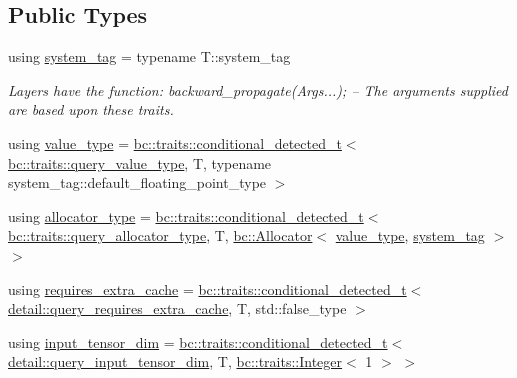 \subsection*{Public Types}
\begin{DoxyCompactItemize}
\item 
using \hyperlink{structbc_1_1nn_1_1layer__traits_a95a88b919abd7c9ebe295a3f5171b31e}{system\+\_\+tag} = typename T\+::system\+\_\+tag
\begin{DoxyCompactList}\small\item\em Layers have the function\+: backward\+\_\+propagate(Args...); -- The arguments supplied are based upon these traits. \end{DoxyCompactList}\item 
using \hyperlink{structbc_1_1nn_1_1layer__traits_a998c8708310306546aa5edb3ad1b46b8}{value\+\_\+type} = \hyperlink{namespacebc_1_1traits_a1a6d378947ec32acd457890854bcd592}{bc\+::traits\+::conditional\+\_\+detected\+\_\+t}$<$ \hyperlink{namespacebc_1_1traits_a40b9437a2ec1bb34ee7d506c8053f906}{bc\+::traits\+::query\+\_\+value\+\_\+type}, T, typename system\+\_\+tag\+::default\+\_\+floating\+\_\+point\+\_\+type $>$
\item 
using \hyperlink{structbc_1_1nn_1_1layer__traits_afbe9ab9133f903efde7f3d307836d489}{allocator\+\_\+type} = \hyperlink{namespacebc_1_1traits_a1a6d378947ec32acd457890854bcd592}{bc\+::traits\+::conditional\+\_\+detected\+\_\+t}$<$ \hyperlink{namespacebc_1_1traits_ab141f0cc8348b4b7ebcb48e6bbb50d09}{bc\+::traits\+::query\+\_\+allocator\+\_\+type}, T, \hyperlink{classbc_1_1allocators_1_1Allocator}{bc\+::\+Allocator}$<$ \hyperlink{structbc_1_1nn_1_1layer__traits_a998c8708310306546aa5edb3ad1b46b8}{value\+\_\+type}, \hyperlink{structbc_1_1nn_1_1layer__traits_a95a88b919abd7c9ebe295a3f5171b31e}{system\+\_\+tag} $>$ $>$
\item 
using \hyperlink{structbc_1_1nn_1_1layer__traits_a7702010ac1dd6f1776bdc089e62c5da4}{requires\+\_\+extra\+\_\+cache} = \hyperlink{namespacebc_1_1traits_a1a6d378947ec32acd457890854bcd592}{bc\+::traits\+::conditional\+\_\+detected\+\_\+t}$<$ \hyperlink{namespacebc_1_1nn_1_1detail_a7cfff1896ea5ef55f6410bb7c6ff3bf3}{detail\+::query\+\_\+requires\+\_\+extra\+\_\+cache}, T, std\+::false\+\_\+type $>$
\item 
using \hyperlink{structbc_1_1nn_1_1layer__traits_ad59c13867670e4e117d657881bc2afe8}{input\+\_\+tensor\+\_\+dim} = \hyperlink{namespacebc_1_1traits_a1a6d378947ec32acd457890854bcd592}{bc\+::traits\+::conditional\+\_\+detected\+\_\+t}$<$ \hyperlink{namespacebc_1_1nn_1_1detail_a4bdf240452d0d96d1f433e7f0f5dd3e7}{detail\+::query\+\_\+input\+\_\+tensor\+\_\+dim}, T, \hyperlink{structbc_1_1traits_1_1Integer}{bc\+::traits\+::\+Integer}$<$ 1 $>$ $>$

\end{DoxyCompactItemize}

